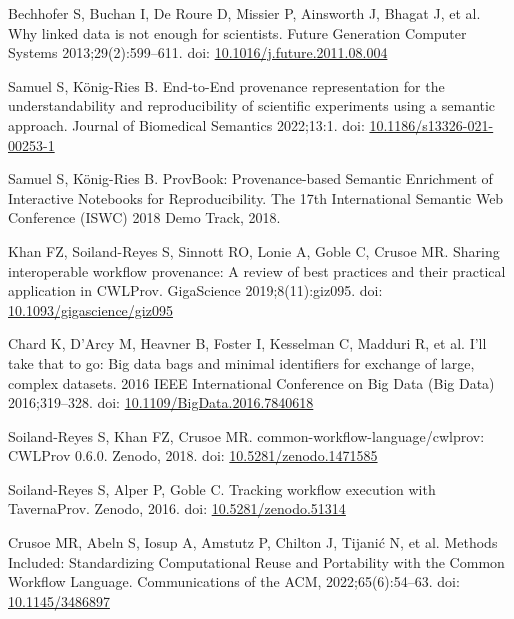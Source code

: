 \documentclass[10pt,letterpaper]{article}
\begin{document}
\begin{thebibliography}{10}
\begin{small}
Bechhofer S, Buchan I, De Roure D, Missier P, Ainsworth J, Bhagat J, et al.
Why linked data is not enough for scientists.
Future Generation Computer Systems 2013;29(2):599--611.
doi: \href{https://doi.org/10.1016/j.future.2011.08.004}{10.1016/j.future.2011.08.004}

Samuel S, König-Ries B.
End-to-End provenance representation for the understandability and reproducibility of scientific experiments using a semantic approach.
Journal of Biomedical Semantics 2022;13:1.
doi: \href{https://doi.org/10.1186/s13326-021-00253-1}{10.1186/s13326-021-00253-1}

Samuel S, König-Ries B.
ProvBook: Provenance-based Semantic Enrichment of Interactive Notebooks for Reproducibility.
The 17th International Semantic Web Conference (ISWC) 2018 Demo Track, 2018.



Khan FZ, Soiland-Reyes S, Sinnott RO, Lonie A, Goble C, Crusoe MR.
Sharing interoperable workflow provenance: A review of best practices and their practical application in CWLProv.
GigaScience 2019;8(11):giz095.
doi: \href{https://doi.org/10.1093/gigascience/giz095}{10.1093/gigascience/giz095}

Chard K, D'Arcy M, Heavner B, Foster I, Kesselman C, Madduri R, et al.
I'll take that to go: Big data bags and minimal identifiers for exchange of large, complex datasets.
2016 IEEE International Conference on Big Data (Big Data) 2016;319--328.
doi: \href{https://doi.org/10.1109/BigData.2016.7840618}{10.1109/BigData.2016.7840618}

Soiland-Reyes S, Khan FZ, Crusoe MR.
common-workflow-language/cwlprov: CWLProv 0.6.0.
Zenodo, 2018.
doi: \href{https://doi.org/10.5281/zenodo.1471585}{10.5281/zenodo.1471585}

Soiland-Reyes S, Alper P, Goble C.
Tracking workflow execution with TavernaProv.
Zenodo, 2016.
doi: \href{https://doi.org/10.5281/zenodo.51314}{10.5281/zenodo.51314}

Crusoe MR, Abeln S, Iosup A, Amstutz P, Chilton J, Tijanić N, et al.
Methods Included: Standardizing Computational Reuse and Portability with the Common Workflow Language.
Communications of the ACM, 2022;65(6):54--63.
doi: \href{https://doi.org/10.1145/3486897}{10.1145/3486897}


\end{small}
\end{thebibliography}
\end{document}
